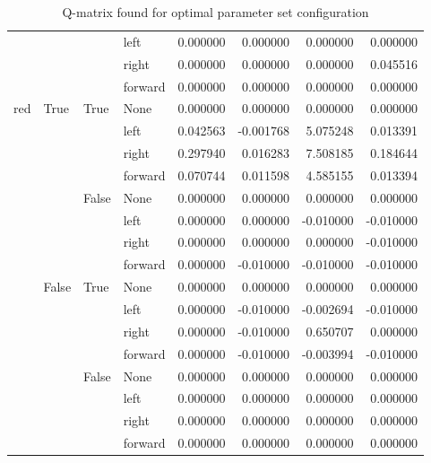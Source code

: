 \documentclass{article}
\begin{document}
\begin{table}
\begin{tabular}{llllrrrr}
      &       &       & left &  0.000000 &  0.000000 &  0.000000 &  0.000000 \\
      &       &       & right &  0.000000 &  0.000000 &  0.000000 &  0.045516 \\
      &       &       & forward &  0.000000 &  0.000000 &  0.000000 &  0.000000 \\
red & True  & True  & None &  0.000000 &  0.000000 &  0.000000 &  0.000000 \\
      &       &       & left &  0.042563 & -0.001768 &  5.075248 &  0.013391 \\
      &       &       & right &  0.297940 &  0.016283 &  7.508185 &  0.184644 \\
      &       &       & forward &  0.070744 &  0.011598 &  4.585155 &  0.013394 \\
      &       & False & None &  0.000000 &  0.000000 &  0.000000 &  0.000000 \\
      &       &       & left &  0.000000 &  0.000000 & -0.010000 & -0.010000 \\
      &       &       & right &  0.000000 &  0.000000 &  0.000000 & -0.010000 \\
      &       &       & forward &  0.000000 & -0.010000 & -0.010000 & -0.010000 \\
      & False & True  & None &  0.000000 &  0.000000 &  0.000000 &  0.000000 \\
      &       &       & left &  0.000000 & -0.010000 & -0.002694 & -0.010000 \\
      &       &       & right &  0.000000 & -0.010000 &  0.650707 &  0.000000 \\
      &       &       & forward &  0.000000 & -0.010000 & -0.003994 & -0.010000 \\
      &       & False & None &  0.000000 &  0.000000 &  0.000000 &  0.000000 \\
      &       &       & left &  0.000000 &  0.000000 &  0.000000 &  0.000000 \\
      &       &       & right &  0.000000 &  0.000000 &  0.000000 &  0.000000 \\
      &       &       & forward &  0.000000 &  0.000000 &  0.000000 &  0.000000 \\
\bottomrule
\end{tabular}
\caption{Q-matrix found for optimal parameter set configuration}
\end{table}
\end{document}
